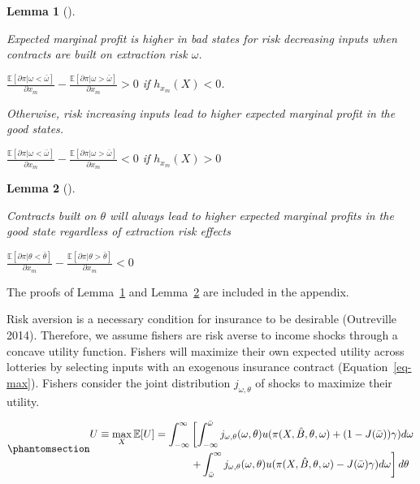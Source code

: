 \documentclass[
  letterpaper,
  DIV=11,
  numbers=noendperiod]{scrartcl}
\theoremstyle{plain}
\newtheorem{lemma}{Lemma}[section]
\theoremstyle{plain}
\theoremstyle{remark}
\begin{document}
\begin{lemma}[]\protect\hypertarget{lem-mp}{}\label{lem-mp}

Expected marginal profit is higher in bad states for risk decreasing
inputs when contracts are built on extraction risk \(\omega\).

\(\frac{\mathbb{E}[\partial \pi|\omega<\bar \omega]}{\partial x_m}-\frac{\mathbb{E}[\partial \pi|\omega>\bar \omega]}{\partial x_m}>0\)
if \(h_{x_m}(X)<0\).

Otherwise, risk increasing inputs lead to higher expected marginal
profit in the good states.

\(\frac{\mathbb{E}[\partial \pi|\omega<\bar \omega]}{\partial x_m}-\frac{\mathbb{E}[\partial \pi|\omega>\bar \omega]}{\partial x_m}<0\)
if \(h_{x_m}(X)>0\)

\end{lemma}

\begin{lemma}[]\protect\hypertarget{lem-theta}{}\label{lem-theta}

Contracts built on \(\theta\) will always lead to higher expected
marginal profits in the good state regardless of extraction risk effects

\(\frac{\mathbb{E}[\partial \pi|\theta<\bar \theta]}{\partial x_m}-\frac{\mathbb{E}[\partial \pi|\theta>\bar \theta]}{\partial x_m}<0\)

\end{lemma}

The proofs of Lemma~\ref{lem-mp} and Lemma~\ref{lem-theta} are included
in the appendix.

Risk aversion is a necessary condition for insurance to be desirable
(Outreville 2014). Therefore, we assume fishers are risk averse to
income shocks through a concave utility function. Fishers will maximize
their own expected utility across lotteries by selecting inputs with an
exogenous insurance contract (Equation~\ref{eq-max}). Fishers consider
the joint distribution \(j_{\omega,\theta}\) of shocks to maximize their
utility.

\begin{equation}\phantomsection\label{eq-max}{
\begin{aligned}
U\equiv\max_{X}\mathbb{E}[U]=\int^{\infty}_{-\infty}&\left[ \int^{\bar \omega}_{-\infty}j_{\omega,\theta}(\omega,\theta)u(\pi(X,\hat{B},\theta,\omega)+(1-J(\bar \omega))\gamma)d\omega \right.\\
&\left.+\int^{\infty}_{\bar{\omega}}j_{\omega,\theta}(\omega,\theta) u(\pi(X,\hat{B},
\theta,\omega)-J(\bar \omega)\gamma)d \omega\right] d\theta
\end{aligned}
}\end{equation}
\end{document}
